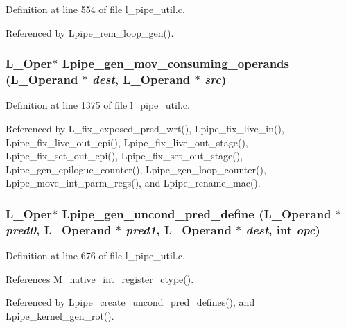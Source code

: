 Definition at line 554 of file l\_\-pipe\_\-util.c.

Referenced by Lpipe\_\-rem\_\-loop\_\-gen().
\subsubsection{\setlength{\rightskip}{0pt plus 5cm}L\_\-Oper$\ast$ Lpipe\_\-gen\_\-mov\_\-consuming\_\-operands (L\_\-Operand $\ast$ {\em dest}, L\_\-Operand $\ast$ {\em src})}\label{l__pipe__util_8c_ee779950f38ef40325d91a06a673d9ae}




Definition at line 1375 of file l\_\-pipe\_\-util.c.

Referenced by L\_\-fix\_\-exposed\_\-pred\_\-wrt(), Lpipe\_\-fix\_\-live\_\-in(), Lpipe\_\-fix\_\-live\_\-out\_\-epi(), Lpipe\_\-fix\_\-live\_\-out\_\-stage(), Lpipe\_\-fix\_\-set\_\-out\_\-epi(), Lpipe\_\-fix\_\-set\_\-out\_\-stage(), Lpipe\_\-gen\_\-epilogue\_\-counter(), Lpipe\_\-gen\_\-loop\_\-counter(), Lpipe\_\-move\_\-int\_\-parm\_\-regs(), and Lpipe\_\-rename\_\-mac().
\subsubsection{\setlength{\rightskip}{0pt plus 5cm}L\_\-Oper$\ast$ Lpipe\_\-gen\_\-uncond\_\-pred\_\-define (L\_\-Operand $\ast$ {\em pred0}, L\_\-Operand $\ast$ {\em pred1}, L\_\-Operand $\ast$ {\em dest}, int {\em opc})}\label{l__pipe__util_8c_af4d8d01138767db21c4b576f99cd96d}




Definition at line 676 of file l\_\-pipe\_\-util.c.

References M\_\-native\_\-int\_\-register\_\-ctype().

Referenced by Lpipe\_\-create\_\-uncond\_\-pred\_\-defines(), and Lpipe\_\-kernel\_\-gen\_\-rot().
